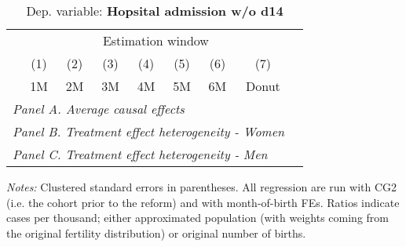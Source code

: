  \begin{table}[H] \begin{threeparttable} \centering \caption{Dep. variable: \textbf{Hopsital admission w/o d14}} {\def\sym#1{\ifmmode^{#1}\else\(^{#1}\)\fi} \begin{tabular}{l*{8}{c}} \toprule & \multicolumn{7}{c}{Estimation window} \\ \cmidrule(lr){2-8}
            &\multicolumn{1}{c}{(1)}&\multicolumn{1}{c}{(2)}&\multicolumn{1}{c}{(3)}&\multicolumn{1}{c}{(4)}&\multicolumn{1}{c}{(5)}&\multicolumn{1}{c}{(6)}&\multicolumn{1}{c}{(7)}\\
            &\multicolumn{1}{c}{1M}&\multicolumn{1}{c}{2M}&\multicolumn{1}{c}{3M}&\multicolumn{1}{c}{4M}&\multicolumn{1}{c}{5M}&\multicolumn{1}{c}{6M}&\multicolumn{1}{c}{Donut}\\
\midrule
 \multicolumn{8}{l}{\emph{Panel A. Average causal effects}} \\       \midrule\multicolumn{8}{l}{\emph{Panel B. Treatment effect heterogeneity - Women}} \\       \midrule\multicolumn{8}{l}{\emph{Panel C. Treatment effect heterogeneity - Men}} \\       
\bottomrule \end{tabular} } \begin{tablenotes} \item \scriptsize \emph{Notes:} Clustered standard errors in parentheses. All regression are run with CG2 (i.e. the cohort prior to the reform) and with month-of-birth FEs. Ratios indicate cases per thousand; either approximated population (with weights coming from the original fertility distribution) or original number of births. \end{tablenotes} \end{threeparttable} \end{table} 
